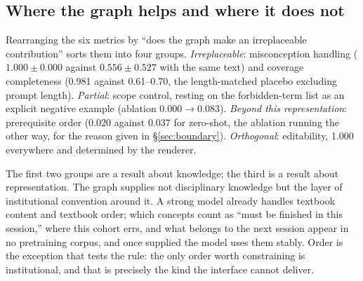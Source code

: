 \documentclass[review,12pt]{elsarticle}
\renewcommand{\_}{\kgunderscore\allowbreak}
\begin{document}
\subsection{Where the graph helps and where it does not}

Rearranging the six metrics by ``does the graph make an irreplaceable
contribution'' sorts them into four groups. \emph{Irreplaceable}: misconception
handling ($1.000 \pm 0.000$ against $0.556 \pm 0.527$ with the same text) and
coverage completeness (0.981 against 0.61--0.70, the length-matched placebo
excluding prompt length). \emph{Partial}: scope control, resting on the
forbidden-term list as an explicit negative example (ablation $0.000 \to
0.083$). \emph{Beyond this representation}: prerequisite order (0.020 against
0.037 for zero-shot, the ablation running the other way, for the reason
given in \S\ref{sec:boundary}). \emph{Orthogonal}: editability, 1.000 everywhere and
determined by the renderer.

The first two groups are a result about knowledge; the third is a result about
representation. The graph supplies not disciplinary knowledge but the
layer of institutional convention around it. A strong model already handles
textbook content and textbook order; which concepts count as ``must be finished
in this session,'' where this cohort errs, and what belongs to the next session
appear in no pretraining corpus, and once supplied the model uses them stably.
Order is the exception that tests the rule: the only order worth constraining
is institutional, and that is precisely the kind the interface cannot deliver.
\end{document}
